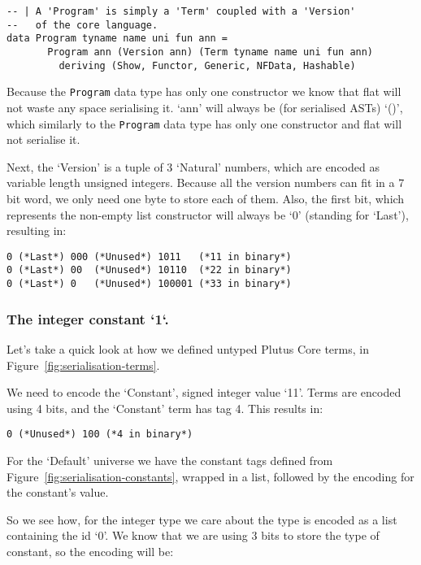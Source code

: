 \begin{verbatim}
-- | A 'Program' is simply a 'Term' coupled with a 'Version' 
--   of the core language.
data Program tyname name uni fun ann = 
       Program ann (Version ann) (Term tyname name uni fun ann)
         deriving (Show, Functor, Generic, NFData, Hashable)
\end{verbatim}

Because the \verb|Program| data type has only one constructor we know that flat will not waste any space serialising it. `ann' will always be (for serialised ASTs) `()', which similarly to the \verb|Program| data type has only one constructor and flat will not serialise it.

Next, the `Version' is a tuple of 3 `Natural' numbers, which are encoded as variable length unsigned integers. Because all the version numbers can fit in a 7 bit word, we only need one byte to store each of them. Also, the first bit, which represents the non-empty list constructor will always be `0' (standing for `Last'), resulting in:

\begin{verbatim}
0 (*Last*) 000 (*Unused*) 1011   (*11 in binary*)
0 (*Last*) 00  (*Unused*) 10110  (*22 in binary*)
0 (*Last*) 0   (*Unused*) 100001 (*33 in binary*)
\end{verbatim}

\subsubsection{The integer constant `1`.}

Let's take a quick look at how we defined untyped Plutus Core terms, in Figure~\ref{fig:serialisation-terms}.

We need to encode the `Constant', signed integer value `11'. Terms are encoded using 4 bits, and the `Constant' term has tag 4. This results in:

\begin{verbatim}
0 (*Unused*) 100 (*4 in binary*)
\end{verbatim}

For the `Default' universe we have the constant tags defined from Figure~\ref{fig:serialisation-constants}, wrapped in a list, followed by the encoding for the constant's value.

So we see how, for the integer type we care about the type is encoded as a list containing the id `0'. We know that we are using 3 bits to store the type of constant, so the encoding will be:

